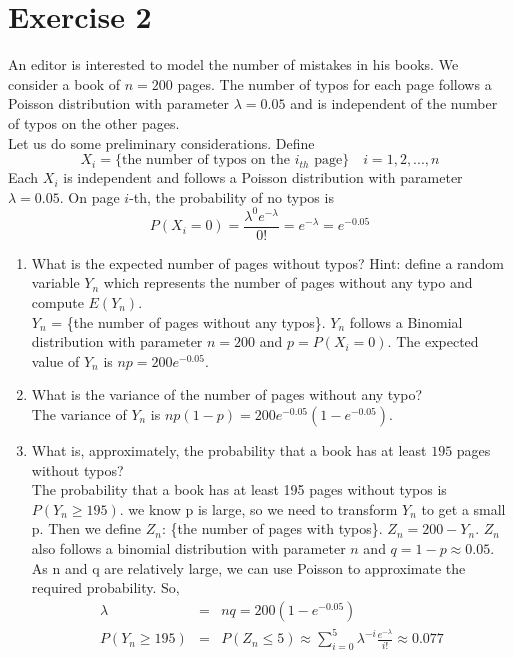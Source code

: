\documentclass[12pt,thmsa]{article}\usepackage[]{graphicx}\usepackage[]{color}
\begin{document}
\section*{Exercise 2}

An editor is interested to model the number of mistakes in his books.
We consider a book of $n=200$ pages. The number of typos for each page follows a Poisson distribution
with parameter $\lambda=0.05$ and is independent of the number of typos on the other pages.\\

\noindent Let us do some preliminary considerations. Define
$$
X_i = \{\text{the number of typos on the $i_{th} $ page}\} \quad i = 1, 2, ..., n
$$
Each $X_i$ is independent and follows a Poisson distribution with parameter $\lambda = 0.05$. On page $i$-th, the probability of no typos is
$$P(X_i= 0) = \frac{\lambda^0e^{-\lambda}}{0!} = e^{-\lambda} =e^{-0.05}
$$
\begin{enumerate}
  \item What is the expected number of pages without typos? \newline
 Hint: define a random variable $Y_n$ which represents the number of pages without any typo and compute $E(Y_n)$.\\

$Y_n$ = \{the number of pages without any typos\}. $Y_n$ follows a Binomial distribution with parameter $n=200$ and $p = P(X_i=0)$. The expected value of $Y_n$ is $np = 200e^{-0.05} $.


  \item What is the variance of the number of pages without any typo?\\

The variance of $Y_n$ is $np(1-p) = 200e^{-0.05}(1-e^{-0.05}) $.
  \item What is, approximately, the probability that a book has at least $195$ pages without typos? \\

The probability that a book has at least 195 pages without typos is $ P(Y_n \geq 195) $.
we know p is large, so we need to transform $Y_n$ to get a small p. Then we define $Z_n$: \{the number of pages with typos\}.
$Z_n = 200-Y_n$. $Z_n$ also follows a binomial distribution with parameter $n$ and $q=1-p \approx 0.05$.
As n and q are relatively large, we can use Poisson to approximate the required probability. So,
\begin{eqnarray*}
\lambda &=& nq = 200(1-e^{-0.05}) \\
 P(Y_n \geq 195) &=& P(Z_n \leq 5) \approx \sum_{i=0}^{5} \lambda^{-i}\frac{e^{-\lambda}}{i!} \approx 0.077
\end{eqnarray*}
\end{enumerate}
\end{document}
